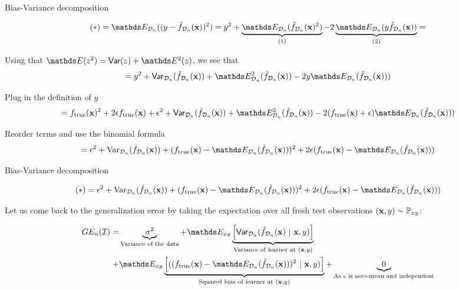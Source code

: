 \documentclass[11pt,compress,t,notes=noshow, xcolor=table]{beamer}
\begin{document}
\begin{framev}[fs=footnotesize]{Bias-Variance decomposition}

$$
(*) = \E_{\D_n}((y - \fh_{\D_n}(\xv))^2) = 
y^2 + \underbrace{\E_{\D_n}(\fh_{\D_n}(\xv)^2)}_{(1)}  - 2\underbrace{\E_{\D_n}(y\fh_{\D_n}(\xv))}_{(2)} =
$$

\vfill

Using that $\E(z^2) =\var(z) + \E^2(z)$, we see that
$$
= y^2 + \var_{\D_n}(\fh_{\D_n}(\xv)) + \E^2_{\D_n}(\fh_{\D_n}(\xv)) - 2y \E_{\D_n}(\fh_{\D_n}(\xv))) 
$$

\vfill

Plug in the definition of $y$
$$
= \ftrue(\xv)^2 +2\epsilon\ftrue(\xv) + \epsilon^2 + \var_{\D_n}(\fh_{\D_n}(\xv)) + \E^2_{\D_n}(\fh_{\D_n}(\xv)) - 2 (\ftrue(\xv)+\epsilon)\E_{\D_n}(\fh_{\D_n}(\xv))) 
$$

\vfill

Reorder terms and use the binomial formula
$$
= \epsilon^2 + \text{Var}_{\D_n}(\fh_{\D_n}(\xv)) + 
(\ftrue(\xv) - \E_{\D_n}(\fh_{\D_n}(\xv)))^2
+2 \epsilon (\ftrue(\xv) - \E_{\D_n}(\fh_{\D_n}(\xv)))
$$

\end{framev}

\begin{framev}[fs=footnotesize]{Bias-Variance decomposition}

$$
(*) = \epsilon^2 + \text{Var}_{\D_n}(\fh_{\D_n}(\xv)) + 
(\ftrue(\xv) - \E_{\D_n}(\fh_{\D_n}(\xv)))^2
+2 \epsilon (\ftrue(\xv) - \E_{\D_n}(\fh_{\D_n}(\xv)))
$$

\vfill 

Let us come back to the generalization error by taking the expectation over all fresh test observations $(\mathbf{x}, y) \sim \mathbb{P}_{xy}$: 
\vfill

\begin{align*}
GE_n(\ind) 
=& \underbrace{\sigma^2}_{\text{Variance of the data}} + \E_{xy}\underbrace{\left[\var_{\D_n}(\fh_{\D_n}(\xv) ~|~\xv, y)\right]}_{\text{Variance of learner at } (\xv, y)} \\ 
+& \E_{xy}\underbrace{\left[((\ftrue(\xv)-\E_{\D_n}(\fh_{\D_n}(\xv)))^2~|~\xv, y)\right]}_{\text{Squared bias of learner at } (\xv, y)} + \underbrace{0}_{\text{As $\epsilon$ is zero-mean and independent}}
\end{align*}

\end{framev}



\endlecture
\end{document}
